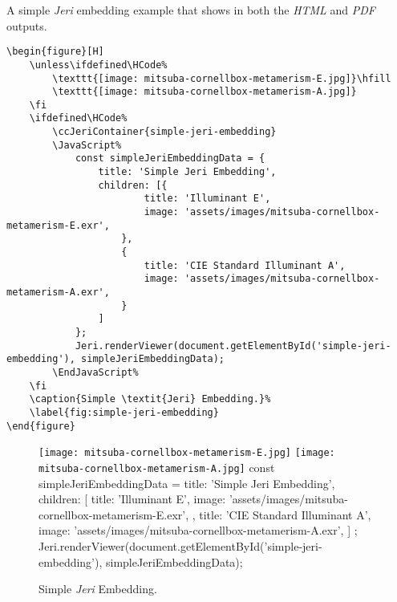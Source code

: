 A simple \textit{Jeri} embedding example that shows in both the \textit{HTML} and \textit{PDF} outputs.

\begin{lstlisting}[caption={Simple \textit{Jeri} Embedding.}]
\begin{figure}[H]
    \unless\ifdefined\HCode%
        \texttt{[image: mitsuba-cornellbox-metamerism-E.jpg]}\hfill
        \texttt{[image: mitsuba-cornellbox-metamerism-A.jpg]}
    \fi
    \ifdefined\HCode%
        \ccJeriContainer{simple-jeri-embedding}
        \JavaScript%
            const simpleJeriEmbeddingData = {
                title: 'Simple Jeri Embedding',
                children: [{
                        title: 'Illuminant E',
                        image: 'assets/images/mitsuba-cornellbox-metamerism-E.exr',
                    },
                    {
                        title: 'CIE Standard Illuminant A',
                        image: 'assets/images/mitsuba-cornellbox-metamerism-A.exr',
                    }
                ]
            };
            Jeri.renderViewer(document.getElementById('simple-jeri-embedding'), simpleJeriEmbeddingData);
        \EndJavaScript%
    \fi
    \caption{Simple \textit{Jeri} Embedding.}%
    \label{fig:simple-jeri-embedding}
\end{figure}
\end{lstlisting}

\begin{figure}[H]
    \unless\ifdefined\HCode%
        \texttt{[image: mitsuba-cornellbox-metamerism-E.jpg]}\hfill
        \texttt{[image: mitsuba-cornellbox-metamerism-A.jpg]}
    \fi
    \ifdefined\HCode%
        \JavaScript%
            const simpleJeriEmbeddingData = {
                title: 'Simple Jeri Embedding',
                children: [{
                        title: 'Illuminant E',
                        image: 'assets/images/mitsuba-cornellbox-metamerism-E.exr',
                    },
                    {
                        title: 'CIE Standard Illuminant A',
                        image: 'assets/images/mitsuba-cornellbox-metamerism-A.exr',
                    }
                ]
            };
            Jeri.renderViewer(document.getElementById('simple-jeri-embedding'), simpleJeriEmbeddingData);
        \EndJavaScript%
    \fi
    \caption{Simple \textit{Jeri} Embedding.}%
    \label{fig:simple-jeri-embedding}
\end{figure}

